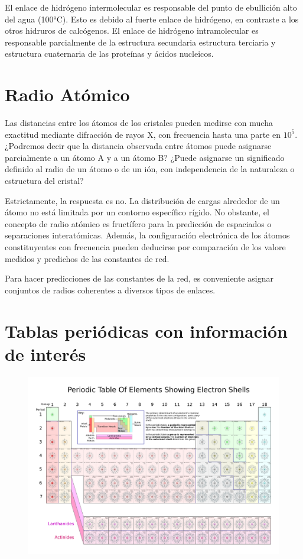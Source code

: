 \documentclass{article}
\begin{document}
El enlace de hidrógeno intermolecular es responsable del punto de ebullición alto del agua (100°C). Esto es debido al fuerte enlace de hidrógeno, en contraste a los otros hidruros de calcógenos. El enlace de hidrógeno intramolecular es responsable parcialmente de la estructura secundaria estructura terciaria y estructura cuaternaria de las proteínas y ácidos nucleicos. 


\section{Radio Atómico}

Las distancias entre los átomos de los cristales pueden medirse con mucha exactitud mediante difracción de rayos X, con frecuencia hasta una parte en $10^5$. ¿Podremos decir que la distancia observada entre átomos puede asignarse parcialmente a un átomo A y a un átomo B? ¿Puede asignarse un significado definido  al radio de un átomo o de un ión, con independencia de la naturaleza o estructura del cristal?

Estrictamente, la respuesta es no. La distribución de cargas alrededor de un átomo no está limitada por un contorno específico rígido. No obstante, el concepto de radio atómico es fructífero para la predicción de espaciados o separaciones interatómicas. Además, la configuración electrónica de los átomos constituyentes con frecuencia pueden deducirse por comparación de los valore medidos y predichos de las constantes de red.

Para hacer predicciones de las constantes de la red, es conveniente asignar conjuntos de radios coherentes a diversos tipos de enlaces.


\section{Tablas periódicas con información de interés}


\begin{figure}[H]
    \centering
    \includegraphics[width=1\textwidth]{Periodic_Table_of_Elements_showing_Electron_Shells_(2011_version).pdf}
 \end{figure}
\end{document}
